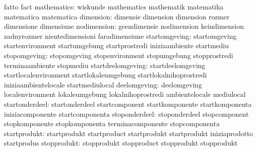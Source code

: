                                   fatto                            fact
                     mathematics: wiskunde                         mathematics
                                  mathematik                       matematika
                                  matematica                       matematica
                       dimension: dimensie                         dimension
                                  dimension                        rozmer
                                  dimensione                       dimensiune
                     nodimension: geendimensie                     nodimension
                                  keindimension                    zadnyrozmer
                                  nientedimensioni                 faradimensiune
                   startomgeving: startomgeving                    startenvironment
                                  startumgebung                    startprostredi
                                  iniziaambiente                   startmediu
                    stopomgeving: stopomgeving                     stopenvironment
                                  stopumgebung                     stopprostredi
                                  terminaambiente                  stopmediu
               startdeelomgeving: startdeelomgeving                startlocalenvironment
                                  startlokaleumgebung              startlokalnihoprostredi
                                  iniziaambientelocale             startmediulocal
                    deelomgeving: deelomgeving                     localenvironment
                                  lokaleumgebung                   lokalnihoprostredi
                                  ambientelocale                   mediulocal
                  startonderdeel: startonderdeel                   startcomponent
                                  startkomponente                  startkomponenta
                                  iniziacomponente                 startcomponenta
                   stoponderdeel: stoponderdeel                    stopcomponent
                                  stopkomponente                   stopkomponenta
                                  terminacomponente                stopcomponenta
                    startprodukt: startprodukt                     startproduct
                                  startprodukt                     startprodukt
                                  iniziaprodotto                   startprodus
                     stopprodukt: stopprodukt                      stopproduct
                                  stopprodukt                      stopprodukt

